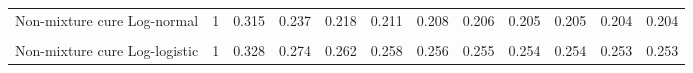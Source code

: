 \documentclass[
]{article}
\begin{document}
\begin{table}[H]
{\begin{tabular}[t]{lrrrrrrrrrrr}
Non-mixture cure Log-normal & 1 & 0.315 & 0.237 & 0.218 & 0.211 & 0.208 & 0.206 & 0.205 & 0.205 & 0.204 & 0.204\\
\cellcolor{gray!10}{Mixture cure Log-logistic} & \cellcolor{gray!10}{1} & \cellcolor{gray!10}{0.318} & \cellcolor{gray!10}{0.258} & \cellcolor{gray!10}{0.245} & \cellcolor{gray!10}{0.241} & \cellcolor{gray!10}{0.238} & \cellcolor{gray!10}{0.237} & \cellcolor{gray!10}{0.236} & \cellcolor{gray!10}{0.236} & \cellcolor{gray!10}{0.235} & \cellcolor{gray!10}{0.235}\\
Non-mixture cure Log-logistic & 1 & 0.328 & 0.274 & 0.262 & 0.258 & 0.256 & 0.255 & 0.254 & 0.254 & 0.253 & 0.253\\
\bottomrule
\end{tabular}}
\end{table}
\end{document}
